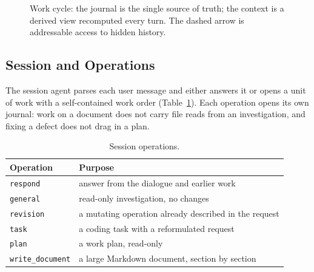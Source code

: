 \documentclass[11pt,a4paper]{article}
\begin{document}
\begin{figure}[t]
\centering
{}
\caption{Work cycle: the journal is the single source of truth; the context is a derived view
recomputed every turn. The dashed arrow is addressable access to hidden history.}
\label{fig:cycle}
\end{figure}

\subsection{Session and Operations}

The session agent parses each user message and either answers it or opens a unit of work with a
self-contained work order (Table~\ref{tab:ops}). Each operation opens its own journal: work on a
document does not carry file reads from an investigation, and fixing a defect does not drag in a
plan.

\begin{table}[h]
\centering
\small
\caption{Session operations.}
\label{tab:ops}
\begin{tabular}{@{}ll@{}}
\toprule
Operation & Purpose \\
\midrule
\texttt{respond} & answer from the dialogue and earlier work \\
\texttt{general} & read-only investigation, no changes \\
\texttt{revision} & a mutating operation already described in the request \\
\texttt{task} & a coding task with a reformulated request \\
\texttt{plan} & a work plan, read-only \\
\texttt{write\_document} & a large Markdown document, section by section \\
\bottomrule
\end{tabular}
\end{table}
\end{document}
